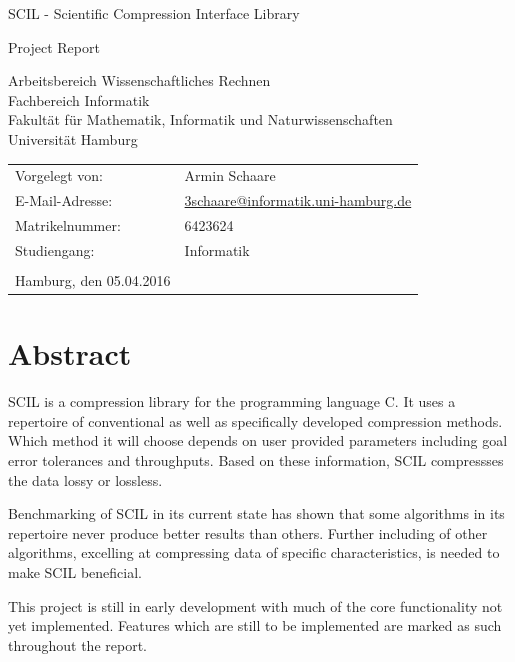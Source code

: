 \documentclass[
	12pt,
	a4paper,
	BCOR10mm,
	DIV14,
	headsepline,
]{scrreprt}
\begin{document}
\begin{titlepage}
	\begin{center}
		{\titlefont\huge SCIL - Scientific Compression Interface Library\par}

		\bigskip
		\bigskip

		{\Large Project Report\par}

		\bigskip
		\bigskip

		{\large Arbeitsbereich Wissenschaftliches Rechnen\\
		Fachbereich Informatik\\
		Fakultät für Mathematik, Informatik und Naturwissenschaften\\
		Universität Hamburg\par}
	\end{center}

	\vfill

	{\large\begin{tabular}{ll}
		Vorgelegt von:  & Armin Schaare \\
		E-Mail-Adresse: & \href{mailto:adresse@email.de}{3schaare@informatik.uni-hamburg.de} \\
		Matrikelnummer: & 6423624 \\
		Studiengang:    & Informatik \\
		\\
		Hamburg, den 05.04.2016
	\end{tabular}\par}
\end{titlepage}

\chapter*{Abstract}

\thispagestyle{empty}


SCIL is a compression library for the programming language C. It uses a
repertoire of conventional as well as specifically developed compression
methods. Which method it will choose depends on user provided parameters
including goal error tolerances and throughputs. Based on these information,
SCIL compressses the data lossy or lossless. \par
Benchmarking of SCIL in its current state has shown that some algorithms
in its repertoire never produce better results than others. Further including of
other algorithms, excelling at compressing data of specific characteristics, is
needed to make SCIL beneficial. \par
This project is still in early development with much of the core functionality
not yet implemented. Features which are still to be implemented are marked as
such throughout the report.
\end{document}
